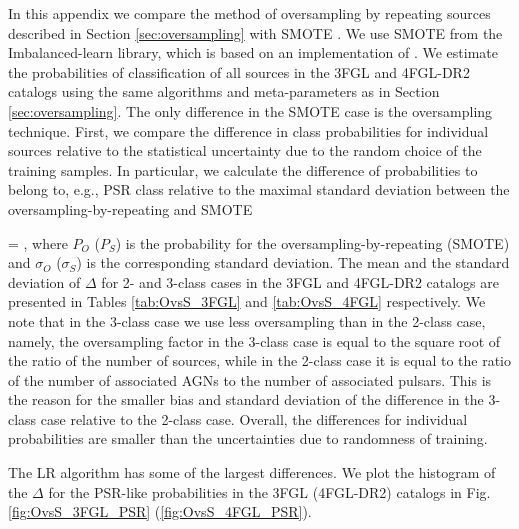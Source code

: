 In this appendix we compare the method of oversampling by repeating sources described in Section \ref{sec:oversampling} 
with SMOTE \citep{Chawla_2002}. We use SMOTE from the Imbalanced-learn library, which is based on an implementation of \citet{Chawla_2002}. 
We estimate the probabilities of classification of all sources in the 3FGL and 4FGL-DR2 catalogs using the same algorithms and meta-parameters as in Section \ref{sec:oversampling}.
The only difference in the SMOTE case is the oversampling technique.
First, we compare the difference in class probabilities for individual sources relative to the statistical uncertainty due to the random choice of the training samples.
In particular, we calculate the difference of probabilities to belong to, e.g., PSR class relative to the maximal standard deviation
between the oversampling-by-repeating and SMOTE

\be
{}
\Delta = ,
\ee
where $P_O$ ($P_S$) is the probability for the oversampling-by-repeating (SMOTE) and $\sigma_O$ ($\sigma_S$) is the corresponding standard deviation. 
The mean and the standard deviation of $\Delta$ for 2- and 3-class cases in the 3FGL and 4FGL-DR2 catalogs are presented in 
Tables \ref{tab:OvsS_3FGL} and \ref{tab:OvsS_4FGL} respectively.
We note that in the 3-class case we use less oversampling than in the 2-class case, namely, the oversampling factor in the 3-class case is equal to the square root of the ratio of the number of sources, while in the 2-class case it is equal to the ratio of the number of associated AGNs to the number of associated pulsars.
This is the reason for the smaller bias and standard deviation of the difference in the 3-class case relative to the 2-class case.
Overall, the differences for individual probabilities are smaller than the uncertainties due to randomness of training.


The LR algorithm has some of the largest differences.
We plot the histogram of the $\Delta$ for the PSR-like probabilities in the 3FGL (4FGL-DR2) catalogs in Fig. \ref{fig:OvsS_3FGL_PSR}
(\ref{fig:OvsS_4FGL_PSR}).

